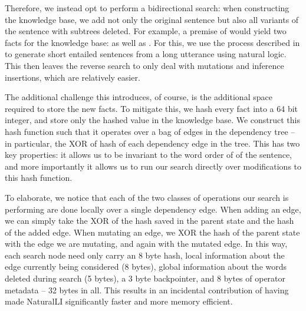 Therefore, we instead opt to perform a bidirectional search:
  when constructing the knowledge base, we add not only the original sentence but
  also all variants of the sentence with subtrees deleted.
For example, a premise of  would yield two facts
  for the knowledge base:  as well as .
For this, we use the process described in  to
  generate short entailed sentences from a long utterance using natural logic.
This then leaves the reverse search to only deal with mutations and inference  
  insertions, which are relatively easier.

The additional challenge this introduces, of course, is the additional space required
  to store the new facts.
To mitigate this, we hash every fact into a 64 bit integer, and store only the hashed 
  value in the knowledge base.
We construct this hash function such that it operates over a bag of edges in the
  dependency tree -- in particular, the XOR of hash of each dependency edge in
  the tree.
This has two key properties: it allows us to be invariant to the word order of
  of the sentence, and more importantly it allows us to run our search directly
  over modifications to this hash function.

To elaborate, we notice that each of the two classes of operations our search is
  performing are done locally over a single dependency edge.
When adding an edge, we can simply take the XOR of the hash saved in the 
  parent state and the hash of the added edge.
When mutating an edge, we XOR the hash of the parent state with the edge we are
  mutating, and again with the mutated edge.
In this way, each search node need only carry an 8 byte hash, local information
  about the edge currently being considered (8 bytes), global information about the words
  deleted during search (5 bytes), a 3 byte backpointer, and 8 bytes of
  operator metadata -- 32 bytes in all.
This results in an incidental contribution of having made NaturalLI significantly
  faster and more memory efficient.

